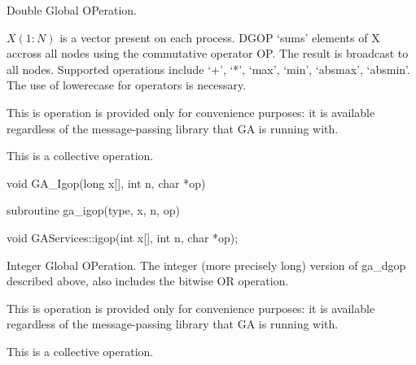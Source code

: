 \documentclass[12pt]{article}
\begin{document}
\wcoll
\begin{desc}

Double Global OPeration.

$X(1:N)$ is a vector present on each process. DGOP `sums' elements of 
X accross all nodes using the commutative operator OP. The result is 
broadcast to all nodes. Supported operations include `+', `*', `max', 
`min', `absmax', `absmin'. The use of lowerecase for operators is necessary.

This is operation is provided only for convenience purposes: it is available 
regardless of the message-passing library that GA is running with.

This is a collective operation.
\end{desc}


\begin{capi}
\begin{ccode}
void GA_Igop(long x[], int n, char *op)
\end{ccode}
\begin{funcargs}
\end{funcargs}
\end{capi}

\begin{fapi}
\begin{fcode}
subroutine ga_igop(type, x, n, op)
\end{fcode}
\begin{funcargs}
\end{funcargs}
\end{fapi}

\begin{cxxapi}
\begin{cxxcode}
void GAServices::igop(int x[], int n, char *op);
\end{cxxcode}
\begin{funcargs}
\end{funcargs}
\end{cxxapi}
\wcoll
\begin{desc}

Integer Global OPeration. The integer (more precisely long) version
of ga_dgop described above, also includes the bitwise OR operation.

This is operation is provided only for convenience purposes: it is 
available regardless of the message-passing library that GA is running with.

This is a collective operation.
\end{desc}
\end{document}
